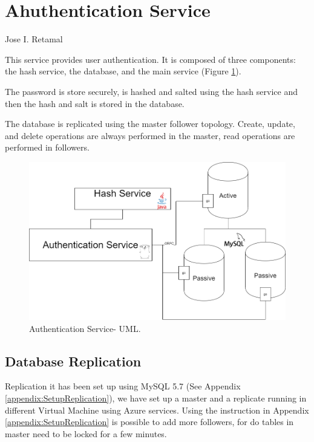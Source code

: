 \section{Ahuthentication Service}
Jose I. Retamal
\vskip 0.1in
\indent
\indent


This service provides user authentication. It is composed of three components: the hash service, the database, and the main service (Figure \ref{auth:xxdfdfdfdf}).

The password is store securely, is hashed and salted using the hash service and then the hash and salt is stored in the database.

The database is replicated using the master follower topology. Create, update, and delete operations are always performed in the master, read operations are performed in followers. 

\begin{figure}[H]
\begin{center}
\includegraphics[width=120mm,scale=1]{img/auth/auth-main-uml.png}
\caption{Authentication Service- UML.}
\label{auth:xxdfdfdfdf}
\end{center}

\end{figure}


\subsection{Database Replication}

\indent
\indent
Replication it has been set up using MySQL 5.7 (See Appendix \ref{appendix:SetupReplication}),  we have set up a master and a replicate running in different Virtual Machine using Azure services. Using the instruction in Appendix \ref{appendix:SetupReplication} is possible to add more followers, for do tables in master need to be locked for a few minutes.

